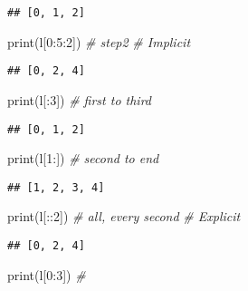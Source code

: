 \documentclass[]{book}
\newenvironment{Shaded}{\begin{snugshade}}{\end{snugshade}}
\newcommand{\BuiltInTok}[1]{#1}
\newcommand{\CommentTok}[1]{\textcolor[rgb]{0.56,0.35,0.01}{\textit{#1}}}
\newcommand{\DecValTok}[1]{\textcolor[rgb]{0.00,0.00,0.81}{#1}}
\newcommand{\NormalTok}[1]{#1}
\theoremstyle{definition}
\theoremstyle{definition}
\theoremstyle{definition}
\theoremstyle{remark}
\begin{document}
\begin{verbatim}
## [0, 1, 2]
\end{verbatim}

\begin{Shaded}
\begin{Highlighting}[]
\BuiltInTok{print}\NormalTok{(l[}\DecValTok{0}\NormalTok{:}\DecValTok{5}\NormalTok{:}\DecValTok{2}\NormalTok{]) }\CommentTok{# step2}
\CommentTok{# Implicit}
\end{Highlighting}
\end{Shaded}

\begin{verbatim}
## [0, 2, 4]
\end{verbatim}

\begin{Shaded}
\begin{Highlighting}[]
\BuiltInTok{print}\NormalTok{(l[:}\DecValTok{3}\NormalTok{]) }\CommentTok{# first to third}
\end{Highlighting}
\end{Shaded}

\begin{verbatim}
## [0, 1, 2]
\end{verbatim}

\begin{Shaded}
\begin{Highlighting}[]
\BuiltInTok{print}\NormalTok{(l[}\DecValTok{1}\NormalTok{:]) }\CommentTok{# second to end}
\end{Highlighting}
\end{Shaded}

\begin{verbatim}
## [1, 2, 3, 4]
\end{verbatim}

\begin{Shaded}
\begin{Highlighting}[]
\BuiltInTok{print}\NormalTok{(l[::}\DecValTok{2}\NormalTok{]) }\CommentTok{# all, every second}
\CommentTok{# Explicit}
\end{Highlighting}
\end{Shaded}

\begin{verbatim}
## [0, 2, 4]
\end{verbatim}

\begin{Shaded}
\begin{Highlighting}[]
\BuiltInTok{print}\NormalTok{(l[}\DecValTok{0}\NormalTok{:}\DecValTok{3}\NormalTok{]) }\CommentTok{# }
\end{Highlighting}
\end{Shaded}
\end{document}
